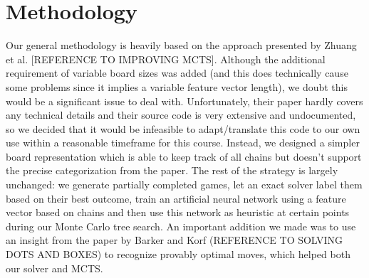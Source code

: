 \section{Methodology}

Our general methodology is heavily based on the approach presented by Zhuang et al. [REFERENCE TO IMPROVING MCTS]. Although the additional requirement of variable board sizes was added (and this does technically cause some problems since it implies a variable feature vector length), we doubt this would be a significant issue to deal with. Unfortunately, their paper hardly covers any technical details and their source code is very extensive and undocumented, so we decided that it would be infeasible to adapt/translate this code to our own use within a reasonable timeframe for this course. Instead, we designed a simpler board representation which is able to keep track of all chains but doesn't support the precise categorization from the paper. The rest of the strategy is largely unchanged: we generate partially completed games, let an exact solver label them based on their best outcome, train an artificial neural network using a feature vector based on chains and then use this network as heuristic at certain points during our Monte Carlo tree search. An important addition we made was to use an insight from the paper by Barker and Korf (REFERENCE TO SOLVING DOTS AND BOXES) to recognize provably optimal moves, which helped both our solver and MCTS.




